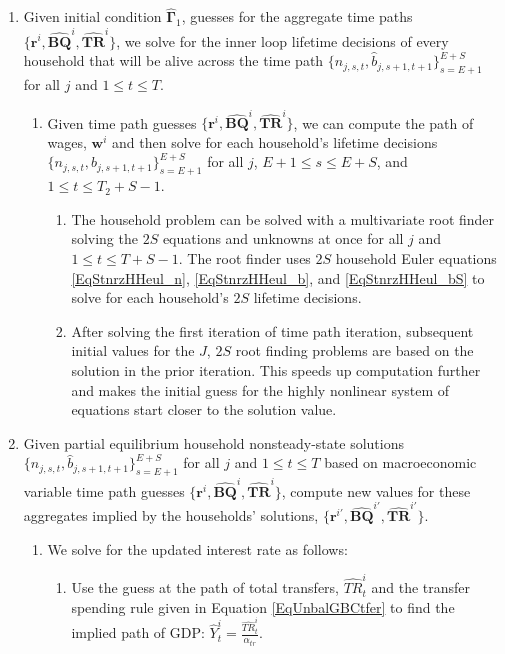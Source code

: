\begin{enumerate}
    \item Given initial condition $\bm{\hat{\Gamma}}_1$, guesses for the aggregate time paths $\{\bm{r}^i,\bm{\hat{BQ}}^i, \bm{\hat{TR}}^i\}$, we solve for the inner loop lifetime decisions of every household that will be alive across the time path $\{n_{j,s,t},\hat{b}_{j,s+1,t+1}\}_{s=E+1}^{E+S}$ for all $j$ and $1\leq t\leq T$.
    \begin{enumerate}
      \item Given time path guesses $\{\bm{r}^i,\bm{\hat{BQ}}^i, \bm{\hat{TR}}^i\}$, we can compute the path of wages, $\bm{w}^i$ and then solve for each household's lifetime decisions $\{n_{j,s,t},\hat{b}_{j,s+1,t+1}\}_{s=E+1}^{E+S}$ for all $j$, $E+1\leq s \leq E+S$, and $1\leq t\leq T_2+S-1$.
      \begin{enumerate}
        \item The household problem can be solved with a multivariate root finder solving the $2S$ equations and unknowns at once for all $j$ and $1\leq t\leq T+S-1$. The root finder uses $2S$ household Euler equations \eqref{EqStnrzHHeul_n}, \eqref{EqStnrzHHeul_b}, and \eqref{EqStnrzHHeul_bS} to solve for each household's $2S$ lifetime decisions.
        \item After solving the first iteration of time path iteration, subsequent initial values for the $J$, $2S$ root finding problems are based on the solution in the prior iteration. This speeds up computation further and makes the initial guess for the highly nonlinear system of equations start closer to the solution value.
      \end{enumerate}
    \end{enumerate}
    \item Given partial equilibrium household nonsteady-state solutions $\{n_{j,s,t},\hat{b}_{j,s+1,t+1}\}_{s=E+1}^{E+S}$ for all $j$ and $1\leq t\leq T$ based on macroeconomic variable time path guesses $\{\bm{r}^i,\bm{\hat{BQ}}^i, \bm{\hat{TR}}^i\}$, compute new values for these aggregates implied by the households' solutions, $\{\bm{r}^{i'},\bm{\hat{BQ}}^{i'}, \bm{\hat{TR}}^{i'}\}$.
    \begin{enumerate}
          \item We solve for the updated interest rate as follows:
    		\begin{enumerate}
    			\item Use the guess at the path of total transfers, $\hat{TR}_{t}^{i}$ and the transfer spending rule given in Equation \eqref{EqUnbalGBCtfer} to find the implied path of GDP: $\hat{Y}_{t}^{i} = \frac{\hat{TR}_{t}^{i}}{\alpha_{tr}}$.

\end{enumerate}
\end{enumerate}
\end{enumerate}
